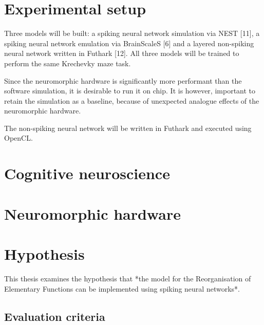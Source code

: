 \documentclass[report.tex]{subfiles}
\begin{document}
\section{Experimental setup}
Three models will be built: a spiking neural network simulation via NEST [11], a spiking neural network emulation via BrainScaleS [6] and a layered non-spiking neural network written in Futhark [12].
All three models will be trained to perform the same Krechevky maze task.

Since the neuromorphic hardware is significantly more performant than the software simulation, it is desirable to run it on chip.
It is however, important to retain the simulation as a baseline, because of unexpected analogue effects of the neuromorphic hardware.

The non-spiking neural network will be written in Futhark and executed using OpenCL.
\section{Cognitive neuroscience}
\section{Neuromorphic hardware}
\section{Hypothesis} \label{sec:hypothesis}
This thesis examines the hypothesis that *the model for the Reorganisation of Elementary Functions can be implemented using spiking neural networks*.
\subsection{Evaluation criteria} \label{sec:hypothesis-criteria}
\end{document}

